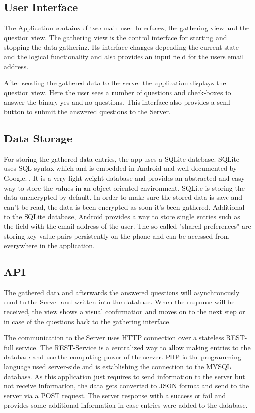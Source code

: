 \begin{flushleft}
\subsection{User Interface}
The Application contains of two main user Interfaces, the gathering view and the question view. 
The gathering view is the control interface for starting and stopping the data gathering. Its interface changes depending the current state and the logical functionality and also provides an input field for the users email address.

After sending the gathered data to the server the application displays the question view. Here the user sees a number of questions and check-boxes to answer the binary yes and no questions. 
This interface also provides a send button to submit the answered questions to the Server.

\subsection{Data Storage}
For storing the gathered data entries, the app uses a SQLite datebase. SQLite uses SQL syntax which and is embedded in Android and well documented by Google. \cite{vogel2010android}. It is a very light weight database and provides an abstracted and easy way to store the values in an object oriented environment. SQLite is storing the data unencrypted by default. In order to make sure the stored data is save and can't be read, the data is been encrypted as soon it's been gathered.
Additional to the SQLite database, Android provides a way to store single entries such as the field with the email address of the user. The so called "shared preferences" are storing key-value-pairs persistently on the phone and can be accessed from everywhere in the application.

\subsection{API}
The gathered data and afterwards the answered questions will asynchronously send to the Server and written into the database. When the response will be received, the view shows a visual confirmation and moves on to the next step or in case of the questions back to the gathering interface. 

The communication to the Server uses HTTP connection over a stateless REST-full service. The REST-Service is a centralized way to allow making entries to the database and use the computing power of the server. PHP is the programming language used server-side and is establishing the connection to the MYSQL database. 
As this application just requires to send information to the server but not receive information, the data gets converted to JSON format and send to the server via a POST request. The server response with a success or fail and provides some additional information in case entries were added to the database. 


\end{flushleft}
